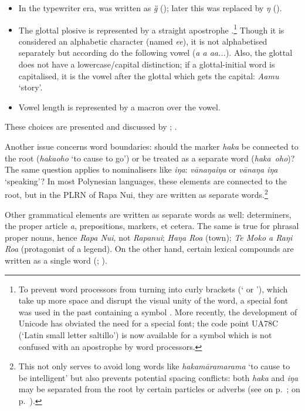 \begin{itemize}
\item 
In the typewriter era,  was written as \textit{\"{g}} (\citealt{WeberWeber1985}); later this was replaced by \textit{ŋ} (\citealt{WeberWeber2005}). 

\item 
The glottal plosive is represented by a straight apostrophe {\ꞌ}.\footnote{\label{fn:21}To prevent word processors from turning {\ꞌ} into curly brackets (‘ or ’), which take up more space and disrupt the visual unity of the word, a special font was used in the past containing a symbol {\ꞌ}. More recently, the development of Unicode has obviated the need for a special font; the code point UA78C (‘Latin small letter saltillo’) is now available for a symbol \textit{\textup{{\ꞌ}}} which is not confused with an apostrophe by word processors.} Though it is considered an alphabetic character (named \textit{e{\ꞌ}e}), it is not alphabetised separately but according do the following vowel (\textit{a {\ꞌ}a a{\ꞌ}a...}). Also, the glottal does not have a lowercase/capital distinction; if a glottal-initial word is capitalised, it is the vowel after the glottal which gets the capital: \textit{\mbox{{\ꞌ}A{\ꞌ}amu}} ‘story’.

\item 
Vowel length is represented by a macron over the vowel. 

\end{itemize}

These choices are presented and discussed by \citet{WeberWeber1985}; \citet{WeberWeber2005}. 

Another issue concerns word boundaries: should the  marker \textit{haka} be connected to the root (\textit{hakaoho} ‘to cause to go’) or be treated as a separate word (\textit{haka~oho})? The same question applies to nominalisers like \textit{iŋa}: \textit{vānaŋaiŋa} or \textit{vānaŋa iŋa} ‘speaking’? In most Polynesian languages, these elements are connected to the root, but in the PLRN  of Rapa Nui, they are written as separate words.\footnote{\label{fn:22}This not only serves to avoid long words like \textit{hakamāramarama} ‘to cause to be intelligent’ but also prevents potential spacing conflicts: both \textit{haka} and \textit{iŋa} may be separated from the root by certain particles or adverbs (see  on p.~\pageref{ex:3.52};  on p.~\pageref{ex:7.99}).} 

Other grammatical elements are written as separate words as well: determiners, the proper article \textit{a}, prepositions,  markers, et cetera. The same is true for phrasal proper nouns, hence \textit{Rapa Nui}, not \textit{Rapanui}; \textit{Haŋa Roa} (town); \textit{Te Moko {\ꞌ}a Raŋi Roa} (protagonist of a legend). On the other hand, certain lexical compounds are written as a single word (; \citealt[27]{WeberWeber1985}). 

